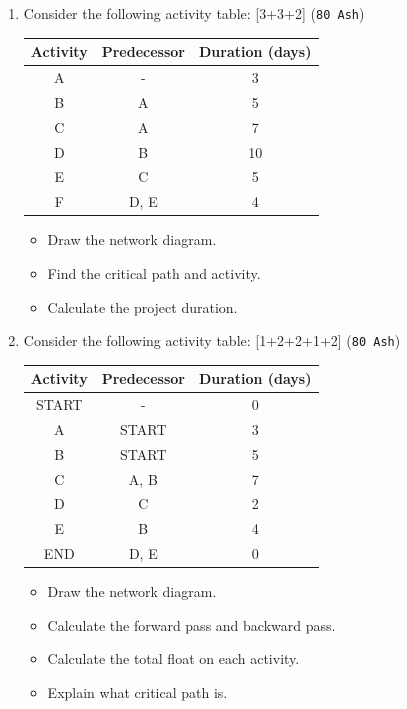 \documentclass[12pt]{article}
\begin{document}
\begin{enumerate}
      \item Consider the following activity table: \hfill [3+3+2] (\texttt{80 Ash})\\
        \begin{tabular}{|c|c|c|}
          \hline
          Activity & Predecessor & Duration (days)\\ \hline
          A & - & 3 \\ \hline
          B & A & 5 \\ \hline
          C & A & 7 \\ \hline
          D & B & 10 \\ \hline
          E & C & 5 \\ \hline
          F & D, E & 4 \\ \hline
        \end{tabular}
        \begin{itemize}[noitemsep]
          \item Draw the network diagram.
          \item Find the critical path and activity.
          \item Calculate the project duration.
        \end{itemize} 

      \item Consider the following activity table: \hfill [1+2+2+1+2] (\texttt{80 Ash})\\
        \begin{tabular}{|c|c|c|}
          \hline
          Activity & Predecessor & Duration (days)\\ \hline
          START & - & 0 \\ \hline
          A & START & 3 \\ \hline
          B & START  & 5 \\ \hline
          C & A, B & 7 \\ \hline
          D & C & 2 \\ \hline
          E & B & 4 \\ \hline
          END & D, E & 0 \\ \hline
        \end{tabular}
        \begin{itemize}[noitemsep]
          \item Draw the network diagram.
          \item Calculate the forward pass and backward pass.
          \item Calculate the total float on each activity.
          \item Explain what critical path is.
        \end{itemize} 


\end{enumerate}
\end{document}
